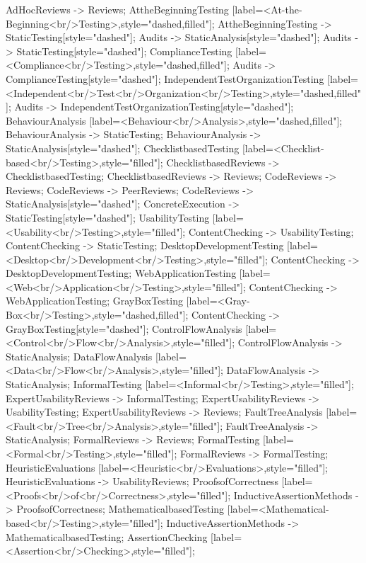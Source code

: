 \documentclass{article}
\begin{document}
{AdHocReviews -> Reviews;
AttheBeginningTesting [label=<At-the-Beginning<br/>Testing>,style="dashed,filled"];
AttheBeginningTesting -> StaticTesting[style="dashed"];
Audits -> StaticAnalysis[style="dashed"];
Audits -> StaticTesting[style="dashed"];
ComplianceTesting [label=<Compliance<br/>Testing>,style="dashed,filled"];
Audits -> ComplianceTesting[style="dashed"];
IndependentTestOrganizationTesting [label=<Independent<br/>Test<br/>Organization<br/>Testing>,style="dashed,filled"];
Audits -> IndependentTestOrganizationTesting[style="dashed"];
BehaviourAnalysis [label=<Behaviour<br/>Analysis>,style="dashed,filled"];
BehaviourAnalysis -> StaticTesting;
BehaviourAnalysis -> StaticAnalysis[style="dashed"];
ChecklistbasedTesting [label=<Checklist-based<br/>Testing>,style="filled"];
ChecklistbasedReviews -> ChecklistbasedTesting;
ChecklistbasedReviews -> Reviews;
CodeReviews -> Reviews;
CodeReviews -> PeerReviews;
CodeReviews -> StaticAnalysis[style="dashed"];
ConcreteExecution -> StaticTesting[style="dashed"];
UsabilityTesting [label=<Usability<br/>Testing>,style="filled"];
ContentChecking -> UsabilityTesting;
ContentChecking -> StaticTesting;
DesktopDevelopmentTesting [label=<Desktop<br/>Development<br/>Testing>,style="filled"];
ContentChecking -> DesktopDevelopmentTesting;
WebApplicationTesting [label=<Web<br/>Application<br/>Testing>,style="filled"];
ContentChecking -> WebApplicationTesting;
GrayBoxTesting [label=<Gray-Box<br/>Testing>,style="dashed,filled"];
ContentChecking -> GrayBoxTesting[style="dashed"];
ControlFlowAnalysis [label=<Control<br/>Flow<br/>Analysis>,style="filled"];
ControlFlowAnalysis -> StaticAnalysis;
DataFlowAnalysis [label=<Data<br/>Flow<br/>Analysis>,style="filled"];
DataFlowAnalysis -> StaticAnalysis;
InformalTesting [label=<Informal<br/>Testing>,style="filled"];
ExpertUsabilityReviews -> InformalTesting;
ExpertUsabilityReviews -> UsabilityTesting;
ExpertUsabilityReviews -> Reviews;
FaultTreeAnalysis [label=<Fault<br/>Tree<br/>Analysis>,style="filled"];
FaultTreeAnalysis -> StaticAnalysis;
FormalReviews -> Reviews;
FormalTesting [label=<Formal<br/>Testing>,style="filled"];
FormalReviews -> FormalTesting;
HeuristicEvaluations [label=<Heuristic<br/>Evaluations>,style="filled"];
HeuristicEvaluations -> UsabilityReviews;
ProofsofCorrectness [label=<Proofs<br/>of<br/>Correctness>,style="filled"];
InductiveAssertionMethods -> ProofsofCorrectness;
MathematicalbasedTesting [label=<Mathematical-based<br/>Testing>,style="filled"];
InductiveAssertionMethods -> MathematicalbasedTesting;
AssertionChecking [label=<Assertion<br/>Checking>,style="filled"];
}
\end{document}
